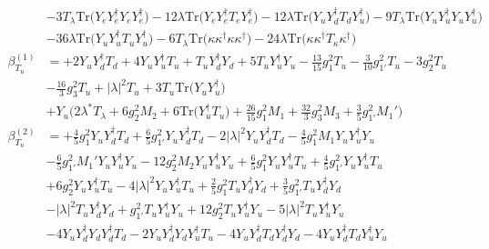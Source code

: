 {\begin{align}
 &-3 T_{\lambda} \mbox{Tr}\Big({Y_e  Y_{e}^{\dagger}  Y_e  Y_{e}^{\dagger}}\Big) -12 \lambda \mbox{Tr}\Big({Y_e  Y_{e}^{\dagger}  T_e  Y_{e}^{\dagger}}\Big) -12 \lambda \mbox{Tr}\Big({Y_u  Y_{d}^{\dagger}  T_d  Y_{u}^{\dagger}}\Big) -9 T_{\lambda} \mbox{Tr}\Big({Y_u  Y_{u}^{\dagger}  Y_u  Y_{u}^{\dagger}}\Big) \nonumber \\ 
 &-36 \lambda \mbox{Tr}\Big({Y_u  Y_{u}^{\dagger}  T_u  Y_{u}^{\dagger}}\Big) -6 T_{\lambda} \mbox{Tr}\Big({\kappa  \kappa^{\dagger}  \kappa  \kappa^{\dagger}}\Big) -24 \lambda \mbox{Tr}\Big({\kappa  \kappa^{\dagger}  T_{\kappa}  \kappa^{\dagger}}\Big) \\ 
\beta_{T_u}^{(1)} & =  
+2 {Y_u  Y_{d}^{\dagger}  T_d} +4 {Y_u  Y_{u}^{\dagger}  T_u} +{T_u  Y_{d}^{\dagger}  Y_d}+5 {T_u  Y_{u}^{\dagger}  Y_u} -\frac{13}{15} g_{1}^{2} T_u -\frac{3}{10} g_{1'}^{2} T_u -3 g_{2}^{2} T_u \nonumber \\ 
 &-\frac{16}{3} g_{3}^{2} T_u +|\lambda|^2 T_u +3 T_u \mbox{Tr}\Big({Y_u  Y_{u}^{\dagger}}\Big) \nonumber \\ 
 &+Y_u \Big(2 \lambda^* T_{\lambda}  + 6 g_{2}^{2} M_2  + 6 \mbox{Tr}\Big({Y_{u}^{\dagger}  T_u}\Big)  + \frac{26}{15} g_{1}^{2} M_1  + \frac{32}{3} g_{3}^{2} M_3  + \frac{3}{5} g_{1'}^{2} M_1' \Big)\\ 
\beta_{T_u}^{(2)} & =  
+\frac{4}{5} g_{1}^{2} {Y_u  Y_{d}^{\dagger}  T_d} +\frac{6}{5} g_{1'}^{2} {Y_u  Y_{d}^{\dagger}  T_d} -2 |\lambda|^2 {Y_u  Y_{d}^{\dagger}  T_d} -\frac{4}{5} g_{1}^{2} M_1 {Y_u  Y_{u}^{\dagger}  Y_u} \nonumber \\ 
 &-\frac{6}{5} g_{1'}^{2} M_1' {Y_u  Y_{u}^{\dagger}  Y_u} -12 g_{2}^{2} M_2 {Y_u  Y_{u}^{\dagger}  Y_u} +\frac{6}{5} g_{1}^{2} {Y_u  Y_{u}^{\dagger}  T_u} +\frac{4}{5} g_{1'}^{2} {Y_u  Y_{u}^{\dagger}  T_u} \nonumber \\ 
 &+6 g_{2}^{2} {Y_u  Y_{u}^{\dagger}  T_u} -4 |\lambda|^2 {Y_u  Y_{u}^{\dagger}  T_u} +\frac{2}{5} g_{1}^{2} {T_u  Y_{d}^{\dagger}  Y_d} +\frac{3}{5} g_{1'}^{2} {T_u  Y_{d}^{\dagger}  Y_d} \nonumber \\ 
 &- |\lambda|^2 {T_u  Y_{d}^{\dagger}  Y_d} +g_{1'}^{2} {T_u  Y_{u}^{\dagger}  Y_u} +12 g_{2}^{2} {T_u  Y_{u}^{\dagger}  Y_u} -5 |\lambda|^2 {T_u  Y_{u}^{\dagger}  Y_u} \nonumber \\ 
 &-4 {Y_u  Y_{d}^{\dagger}  Y_d  Y_{d}^{\dagger}  T_d} -2 {Y_u  Y_{d}^{\dagger}  Y_d  Y_{u}^{\dagger}  T_u} -4 {Y_u  Y_{d}^{\dagger}  T_d  Y_{d}^{\dagger}  Y_d} -4 {Y_u  Y_{d}^{\dagger}  T_d  Y_{u}^{\dagger}  Y_u} \nonumber \\ 

\end{align}}
